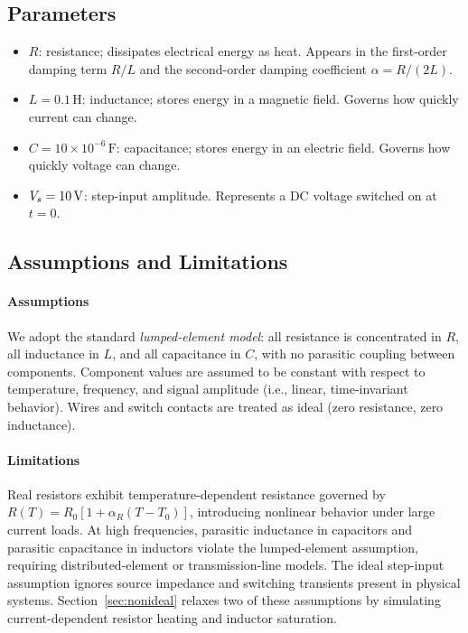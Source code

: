 \subsection{Parameters}

\begin{itemize}
  \item $R$: resistance; dissipates electrical energy as heat. Appears in the
        first-order damping term $R/L$ and the second-order damping
        coefficient $\alpha = R/(2L)$.
  \item $L = 0.1\,\mathrm{H}$: inductance; stores energy in a magnetic field.
        Governs how quickly current can change.
  \item $C = 10\times 10^{-6}\,\mathrm{F}$: capacitance; stores energy in an
        electric field. Governs how quickly voltage can change.
  \item $V_s = 10\,\mathrm{V}$: step-input amplitude. Represents a DC voltage
        switched on at $t = 0$.
\end{itemize}

\subsection{Assumptions and Limitations}

\paragraph{Assumptions}
We adopt the standard \emph{lumped-element model}: all resistance is
concentrated in $R$, all inductance in $L$, and all capacitance in $C$,
with no parasitic coupling between components.
Component values are assumed to be constant with respect to temperature,
frequency, and signal amplitude (i.e., linear, time-invariant behavior).
Wires and switch contacts are treated as ideal (zero resistance, zero
inductance).

\paragraph{Limitations}
Real resistors exhibit temperature-dependent resistance governed by
$R(T) = R_0[1 + \alpha_R(T - T_0)]$, introducing nonlinear behavior
under large current loads.
At high frequencies, parasitic inductance in capacitors and parasitic
capacitance in inductors violate the lumped-element assumption, requiring
distributed-element or transmission-line models.
The ideal step-input assumption ignores source impedance and switching
transients present in physical systems.
Section~\ref{sec:nonideal} relaxes two of these assumptions by simulating
current-dependent resistor heating and inductor saturation.


